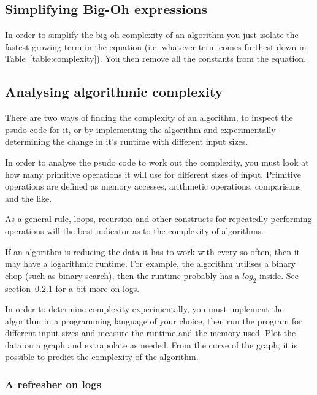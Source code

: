 \subsection{Simplifying Big-Oh expressions}

In order to simplify the big-oh complexity of an algorithm you just isolate the
fastest growing term in the equation (i.e. whatever term comes furthest down in
Table~\ref{table:complexity}). You then remove all the constants from the
equation.


\subsection{Analysing algorithmic complexity}

There are two ways of finding the complexity of an algorithm, to inspect the
psudo code for it, or by implementing the algorithm and experimentally
determining the change in it's runtime with different input sizes.


In order to analyse the psudo code to work out the complexity, you must look at
how many primitive operations it will use for different sizes of input.
Primitive operations are defined as memory accesses, arithmetic operations,
comparisons and the like.

As a general rule, loops, recursion and other constructs for repeatedly
performing operations will the best indicator as to the complexity of
algorithms.

If an algorithm is reducing the data it has to work with every so often, then it
may have a logarithmic runtime. For example, the algorithm utilises a binary
chop (such as binary search), then the runtime probably has a $log_2$ inside.
See section~\ref{subsubsec:logs} for a bit more on logs.

In order to determine complexity experimentally, you must implement the
algorithm in a programming language of your choice, then run the program for
different input sizes and measure the runtime and the memory used. Plot the data
on a graph and extrapolate as needed. From the curve of the graph, it is
possible to predict the complexity of the algorithm.

\subsubsection{A refresher on logs}
\label{subsubsec:logs}

